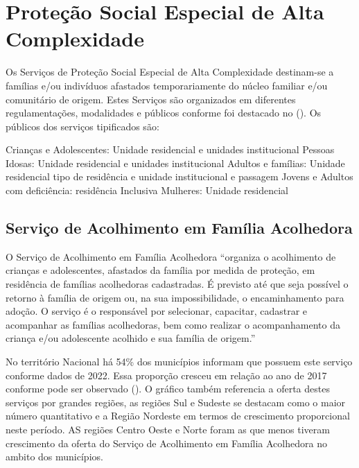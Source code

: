 \documentclass[
  brazilian]{report}
\begin{document}
\hypertarget{proteuxe7uxe3o-social-especial-de-alta-complexidade}{%
\section{Proteção Social Especial de Alta
Complexidade}\label{proteuxe7uxe3o-social-especial-de-alta-complexidade}}

Os Serviços de Proteção Social Especial de Alta Complexidade destinam-se
a famílias e/ou indivíduos afastados temporariamente do núcleo familiar
e/ou comunitário de origem. Estes Serviços são organizados em diferentes
regulamentações, modalidades e públicos conforme foi destacado no
(). Os públicos dos serviços tipificados são:

Crianças e Adolescentes: Unidade residencial e unidades institucional
Pessoas Idosas: Unidade residencial e unidades institucional Adultos e
famílias: Unidade residencial tipo de residência e unidade institucional
e passagem Jovens e Adultos com deficiência: residência Inclusiva
Mulheres: Unidade residencial

\hypertarget{serviuxe7o-de-acolhimento-em-famuxedlia-acolhedora}{%
\subsection{Serviço de Acolhimento em Família
Acolhedora}\label{serviuxe7o-de-acolhimento-em-famuxedlia-acolhedora}}

O Serviço de Acolhimento em Família Acolhedora ``organiza o acolhimento
de crianças e adolescentes, afastados da família por medida de proteção,
em residência de famílias acolhedoras cadastradas. É previsto até que
seja possível o retorno à família de origem ou, na sua impossibilidade,
o encaminhamento para adoção. O serviço é o responsável por selecionar,
capacitar, cadastrar e acompanhar as famílias acolhedoras, bem como
realizar o acompanhamento da criança e/ou adolescente acolhido e sua
família de origem.''

No território Nacional há 54\% dos municípios informam que possuem este
serviço conforme dados de 2022. Essa proporção cresceu em relação ao ano
de 2017 conforme pode ser observado (). O
gráfico também referencia a oferta destes serviços por grandes regiões,
as regiões Sul e Sudeste se destacam como o maior número quantitativo e
a Região Nordeste em termos de crescimento proporcional neste período.
AS regiões Centro Oeste e Norte foram as que menos tiveram crescimento
da oferta do Serviço de Acolhimento em Família Acolhedora no ambito dos
municípios.
\end{document}
